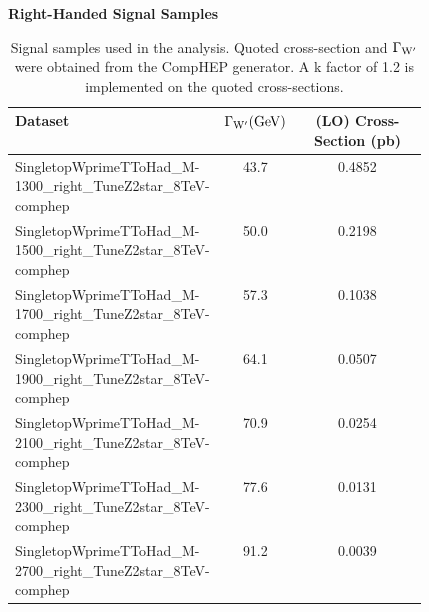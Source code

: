 \begin{table}
\begin{center}
\bf{Right-Handed Signal Samples}
\begin{tabular}{p{0.48\linewidth}|c|c}
\hline\hline
\bf{Dataset} & \bf{$\Gamma_{\mathrm{W}^\prime} (\mathrm{GeV})$} & \bf{(LO) Cross-Section (pb)} \\
\hline\hline
SingletopWprimeTToHad\_M-1300\_right\_TuneZ2star\_8TeV-comphep & 43.7 & 0.4852 \\
SingletopWprimeTToHad\_M-1500\_right\_TuneZ2star\_8TeV-comphep  & 50.0 & 0.2198 \\
SingletopWprimeTToHad\_M-1700\_right\_TuneZ2star\_8TeV-comphep  & 57.3 & 0.1038 \\
SingletopWprimeTToHad\_M-1900\_right\_TuneZ2star\_8TeV-comphep  & 64.1 & 0.0507 \\
SingletopWprimeTToHad\_M-2100\_right\_TuneZ2star\_8TeV-comphep  & 70.9 & 0.0254 \\
SingletopWprimeTToHad\_M-2300\_right\_TuneZ2star\_8TeV-comphep  & 77.6 & 0.0131 \\
SingletopWprimeTToHad\_M-2700\_right\_TuneZ2star\_8TeV-comphep  & 91.2 & 0.0039 \\
\hline
\end{tabular}
\end{center}
\caption{Signal samples used in the analysis.  Quoted cross-section and $\Gamma_{\mathrm{W}^\prime}$ were obtained from the CompHEP generator. A k factor of 1.2 is implemented on the quoted cross-sections.}
\label{table:signalsets}
\end{table}


